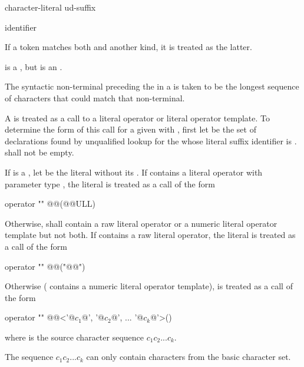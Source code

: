 \begin{bnf}
\br
    character-literal ud-suffix
\end{bnf}

\begin{bnf}
\br
    identifier
\end{bnf}

\pnum
If a token matches both  and another  kind, it
is treated as the latter.
\begin{example}
is a , but  is an
.
\end{example}
The syntactic non-terminal preceding the  in a
 is taken to be the longest sequence of
characters that could match that non-terminal.

\pnum
A  is treated as a call to a literal operator or
literal operator template.
To determine the form of this call for
a given  
with  ,
first let  be the set of declarations
found by unqualified lookup for the 
whose literal suffix identifier is .
 shall not be empty.

\pnum
If  is a , let  be the literal
without its . If  contains a literal operator with
parameter type , the literal  is treated as a call of
the form
\begin{codeblock}
operator "" @@(@@ULL)
\end{codeblock}
Otherwise,  shall contain a raw literal operator
or a numeric literal operator template but not both.
If  contains a raw literal operator,
the literal  is treated as a call of the form
\begin{codeblock}
operator "" @@("@@")
\end{codeblock}
Otherwise ( contains a numeric literal operator template),
 is treated as a call of the form
\begin{codeblock}
operator "" @@<'@$c_1$@', '@$c_2$@', ... '@$c_k$@'>()
\end{codeblock}
where  is the source character sequence $c_1c_2...c_k$.
\begin{note}
The sequence
$c_1c_2...c_k$ can only contain characters from the basic character set.
\end{note}

